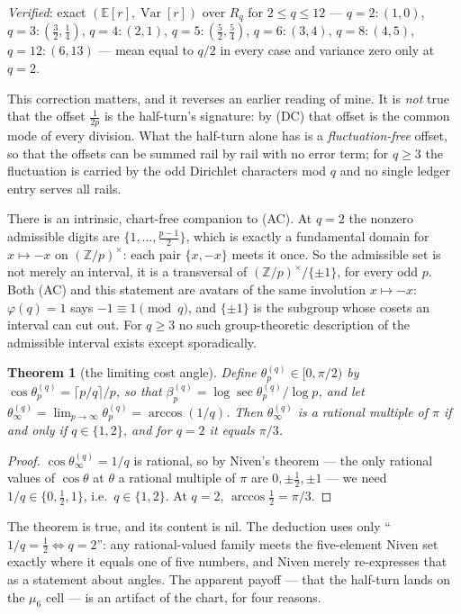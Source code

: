 \documentclass[11pt]{article}
\newtheorem{theorem}{Theorem}
\begin{document}
\emph{Verified}: exact $(\mathbb E[r],\operatorname{Var}[r])$ over $R_q$ for $2\le q\le12$ ---
$q=2:(1,0)$, $q=3:(\tfrac32,\tfrac14)$, $q=4:(2,1)$, $q=5:(\tfrac52,\tfrac54)$, $q=6:(3,4)$,
$q=8:(4,5)$, $q=12:(6,13)$ --- mean equal to $q/2$ in every case and variance zero only at
$q=2$.

This correction matters, and it reverses an earlier reading of mine.  It is \emph{not} true
that the offset $\tfrac1{2p}$ is the half-turn's signature: by (DC) that offset is the common
mode of every division.  What the half-turn alone has is a \emph{fluctuation-free} offset, so
that the offsets can be summed rail by rail with no error term; for $q\ge3$ the fluctuation is
carried by the odd Dirichlet characters mod $q$ and no single ledger entry serves all rails.

There is an intrinsic, chart-free companion to (AC).  At $q=2$ the nonzero admissible digits
are $\{1,\dots,\tfrac{p-1}2\}$, which is exactly a fundamental domain for $x\mapsto-x$ on
$(\mathbb Z/p)^{\times}$: each pair $\{x,-x\}$ meets it once.  So the admissible set is not
merely an interval, it is a transversal of $(\mathbb Z/p)^{\times}/\{\pm1\}$, for every odd
$p$.  Both (AC) and this statement are avatars of the same involution $x\mapsto-x$:
$\varphi(q)=1$ says $-1\equiv1\pmod q$, and $\{\pm1\}$ is the subgroup whose cosets an
interval can cut out.  For $q\ge3$ no such group-theoretic description of the admissible
interval exists except sporadically.

\begin{theorem}[the limiting cost angle]\label{thm:niven}
Define $\theta_p^{(q)}\in[0,\pi/2)$ by $\cos\theta_p^{(q)}=\lceil p/q\rceil/p$, so that
$\beta_p^{(q)}=\log\sec\theta_p^{(q)}/\log p$, and let
$\theta_\infty^{(q)}=\lim_{p\to\infty}\theta_p^{(q)}=\arccos(1/q)$.  Then
$\theta_\infty^{(q)}$ is a rational multiple of $\pi$ if and only if $q\in\{1,2\}$, and for
$q=2$ it equals $\pi/3$.
\end{theorem}

\begin{proof}
$\cos\theta_\infty^{(q)}=1/q$ is rational, so by Niven's theorem --- the only rational values
of $\cos\theta$ at $\theta$ a rational multiple of $\pi$ are $0,\pm\frac12,\pm1$ --- we need
$1/q\in\{0,\tfrac12,1\}$, i.e.\ $q\in\{1,2\}$.  At $q=2$, $\arccos\frac12=\pi/3$.
\end{proof}

The theorem is true, and its content is nil.  The deduction uses only
``$1/q=\tfrac12\iff q=2$'': any rational-valued family meets the five-element Niven set exactly
where it equals one of five numbers, and Niven merely re-expresses that as a statement about
angles.  The apparent payoff --- that the half-turn lands on the $\mu_6$ cell --- is an
artifact of the chart, for four reasons.
\end{document}
